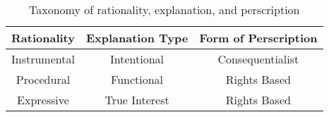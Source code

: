 \begin{table}[h]
\centering 
\begin{tabular}{ccc}
\hline
\textbf{Rationality} & \textbf{Explanation Type} & \textbf{Form of Perscription} \\ 
\hline
 Instrumental & Intentional & Consequentialist  \\
 Procedural & Functional & Rights Based 	\\
 Expressive & True Interest & Rights Based 	\\
\hline 
\end{tabular}

\caption{Taxonomy of rationality, explanation, and perscription}
\label{tab:taxonomy_rationality}
\end{table}